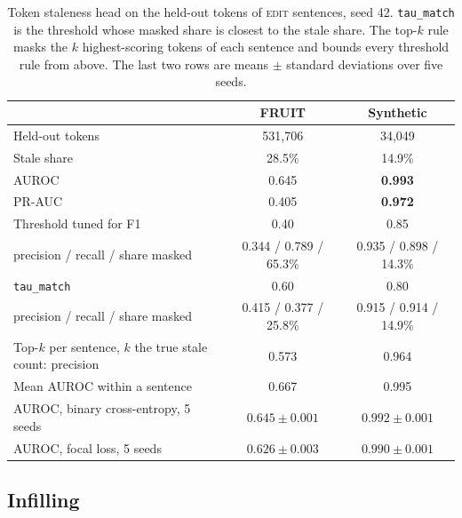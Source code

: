 \documentclass[]{paper}
\newcommand{\edit}{\textsc{edit}}
\begin{document}
\begin{table}[H]
\caption{Token staleness head on the held-out tokens of \edit{} sentences, seed 42. \texttt{tau\_match} is the threshold whose masked share is closest to the stale share. The top-$k$ rule masks the $k$ highest-scoring tokens of each sentence and bounds every threshold rule from above. The last two rows are means $\pm$ standard deviations over five seeds.}
\label{tab:staleness_full}
\centering
\footnotesize
\begin{tabular}{lcc}
\toprule
 & FRUIT & Synthetic \\
\midrule
Held-out tokens & 531,706 & 34,049 \\
Stale share & 28.5\% & 14.9\% \\
AUROC & 0.645 & \textbf{0.993} \\
PR-AUC & 0.405 & \textbf{0.972} \\
\midrule
Threshold tuned for F1 & 0.40 & 0.85 \\
\quad precision / recall / share masked & 0.344 / 0.789 / 65.3\% & 0.935 / 0.898 / 14.3\% \\
\texttt{tau\_match} & 0.60 & 0.80 \\
\quad precision / recall / share masked & 0.415 / 0.377 / 25.8\% & 0.915 / 0.914 / 14.9\% \\
\midrule
Top-$k$ per sentence, $k$ the true stale count: precision & 0.573 & 0.964 \\
Mean AUROC within a sentence & 0.667 & 0.995 \\
\midrule
AUROC, binary cross-entropy, 5 seeds & $0.645 \pm 0.001$ & $0.992 \pm 0.001$ \\
AUROC, focal loss, 5 seeds & $0.626 \pm 0.003$ & $0.990 \pm 0.001$ \\
\bottomrule
\end{tabular}
\end{table}

\subsection{Infilling}
\end{document}
